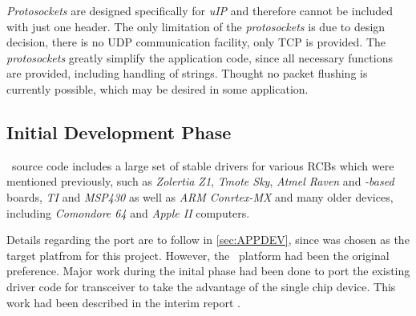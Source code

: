   \emph{Protosockets} are designed specifically for \emph{uIP} and therefore 
 cannot be included with just one header. The only limitation of the
 \emph{protosockets} is due to design decision, there is no UDP communication
 facility, only TCP is provided. The \emph{protosockets} greatly simplify the
 application code, since all necessary functions are provided, including
 handling of strings. Thought no packet flushing is currently possible, which
 may be desired in some application.

\subsection{Initial Development Phase}

  \Contiki\ source code includes a large set of stable drivers for various
 RCBs which were mentioned previously, such as \emph{Zolertia Z1}, \emph{Tmote
 Sky}, \emph{Atmel Raven} and \emph{-based} boards, \emph{TI}
  and \emph{MSP430} as well as \emph{ARM Conrtex-MX} and many
 older devices, including \emph{Comondore 64} and \emph{Apple II} computers.

 Details regarding the  port \cite{links:contiki:port:mc1322x}
 are to follow in \ref{sec:APPDEV}, since  was chosen as the
 target platfrom for this project. However, the \RFA\ platform had been the
 original preference. Major work during the inital phase had been done to
 port the existing driver code for  transceiver to take the
 advantage of the single chip device. This work had been described in the
 interim report \cite{wmi:irep}.

